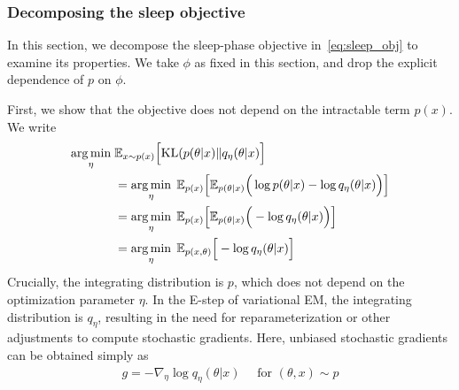 

\subsubsection{Decomposing the sleep objective}
\label{sec:sleep_details}
In this section, we decompose the sleep-phase objective in~\eqref{eq:sleep_obj} to examine its properties. 
We take $\phi$ as fixed in this section, and drop the explicit dependence of $p$ on $\phi$.

First, we show that the objective does not depend on the intractable term $p(x)$. 
We write
\begin{align}
 \operatorname*{arg\,min}_{\eta} \; & \mathbb{E}_{x \sim p(x)}\Big[ \mathrm{KL}(p(\theta | x) \| q_\eta(\theta | x)\Big] \\
  &=\operatorname*{arg\,min}_{\eta} \; \mathbb E_{p(x)}\Big[\mathbb E_{p(\theta | x)}\Big(\log p(\theta | x) - \log q_\eta(\theta | x) \Big)\Big]\\
&=\operatorname*{arg\,min}_{\eta} \; \mathbb E_{p(x)}\Big[\mathbb E_{p(\theta | x)}\Big( - \log q_\eta(\theta | x) \Big)\Big]\\
&=\operatorname*{arg\,min}_{\eta} \; \mathbb E_{p(x, \theta)}\Big[- \log q_\eta(\theta | x) \Big]\label{eq:sleep_loss_simple}
\end{align}
Crucially, the integrating distribution is $p$, which does not depend on the optimization parameter $\eta$.
In the E-step of variational EM, the integrating distribution is $q_\eta$, resulting in the need for reparameterization or other adjustments to compute stochastic gradients. 
Here, unbiased stochastic gradients can be obtained simply as 
\begin{align}
    g = -\nabla_\eta \log q_\eta(\theta | x) \quad \text{ for } (\theta, x)\sim p
\end{align}

